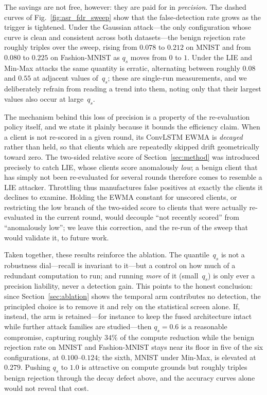 \documentclass[journal]{IEEEtran}
\begin{document}
The savings are not free, however: they are paid for in \emph{precision}. The dashed curves of Fig.~\ref{fig:asr_fdr_sweep} show that the false-detection rate grows as the trigger is tightened. Under the Gaussian attack---the only configuration whose curve is clean and consistent across both datasets---the benign rejection rate roughly triples over the sweep, rising from $0.078$ to $0.212$ on MNIST and from $0.080$ to $0.225$ on Fashion-MNIST as $q_s$ moves from $0$ to $1$. Under the LIE and Min-Max attacks the same quantity is erratic, alternating between roughly $0.08$ and $0.55$ at adjacent values of~$q_s$; these are single-run measurements, and we deliberately refrain from reading a trend into them, noting only that their largest values also occur at large~$q_s$.

The mechanism behind this loss of precision is a property of the re-evaluation policy itself, and we state it plainly because it bounds the efficiency claim. When a client is not re-scored in a given round, its ConvLSTM EWMA is \emph{decayed} rather than held, so that clients which are repeatedly skipped drift geometrically toward zero. The two-sided relative score of Section~\ref{sec:method} was introduced precisely to catch LIE, whose clients score anomalously \emph{low}; a benign client that has simply not been re-evaluated for several rounds therefore comes to resemble a LIE attacker. Throttling thus manufactures false positives at exactly the clients it declines to examine. Holding the EWMA constant for unscored clients, or restricting the low branch of the two-sided score to clients that were actually re-evaluated in the current round, would decouple ``not recently scored'' from ``anomalously low''; we leave this correction, and the re-run of the sweep that would validate it, to future work.

Taken together, these results reinforce the ablation. The quantile~$q_s$ is not a robustness dial---recall is invariant to it---but a control on how much of a redundant computation to run; and running \emph{more} of it (small~$q_s$) is only ever a precision liability, never a detection gain. This points to the honest conclusion: since Section~\ref{sec:ablation} shows the temporal arm contributes no detection, the principled choice is to remove it and rely on the statistical screen alone. If, instead, the arm is retained---for instance to keep the fused architecture intact while further attack families are studied---then $q_s = 0.6$ is a reasonable compromise, capturing roughly $34\%$ of the compute reduction while the benign rejection rate on MNIST and Fashion-MNIST stays near its floor in five of the six configurations, at $0.100$--$0.124$; the sixth, MNIST under Min-Max, is elevated at $0.279$. Pushing $q_s$ to $1.0$ is attractive on compute grounds but roughly triples benign rejection through the decay defect above, and the accuracy curves alone would not reveal that cost.
\end{document}
